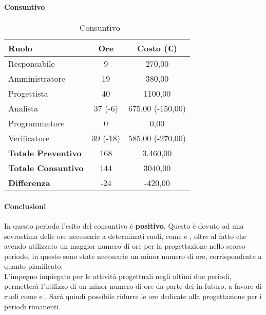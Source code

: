 \documentclass[./PianoDiProgetto.tex]{subfiles}
\begin{document}
\subsubsection{\PerPD}
\paragraph{Consuntivo}
		\begin{table}[h]
		\centering
		\begin{tabular}{l * {2}{c}}
			\toprule
			\textbf{Ruolo} & \textbf{Ore} & \textbf{Costo (\euro{})} \\
			\midrule
			Responsabile &	9 & 270,00 \\
			Amministratore & 19 & 380,00\\
			Progettista & 40  & 1100,00 \\
			Analista & 37 (-6) & 675,00 (-150,00) \\
			Programmatore & 0 & 0,00 \\
			Verificatore & 39 (-18) & 585,00 (-270,00) \\
			\midrule
			\textbf{Totale Preventivo} & 168
 & 3.460,00
 \\
			\textbf{Totale Consuntivo} & 144 & 3040,00
 \\
			\midrule
			\textbf{Differenza} & -24 & -420,00 \\
			\bottomrule
		\end{tabular}
		\caption{\PerPD{} - Consuntivo}

	\end{table}
	\paragraph{Conclusioni}
	In questo periodo l'esito del consuntivo è \textbf{positivo}. Questo è dovuto ad una sovrastima delle ore necessarie a determinati ruoli, come \AN{} e \VER{}, oltre al fatto che avendo utilizzato un maggior numero di ore per la progettazione nello scorso periodo, in questo sono 
state necessarie un minor numero di ore, corrispondente a quanto pianificato.\\
L'impegno impiegato per le attività progettuali negli ultimi due periodi, permetterà l'utilizzo di un minor numero di ore da parte dei \PJP{} in futuro, a favore di ruoli come \PRP{} e \VERP{}. Sarà quindi possibile ridurre le ore dedicate alla progettazione per i periodi rimanenti.
\subsubsection{\PerC}
\end{document}
